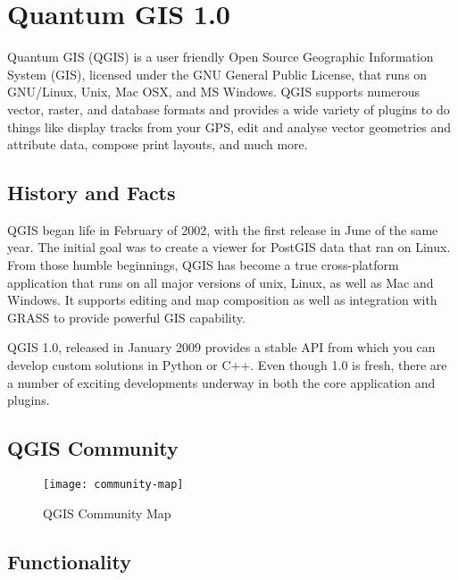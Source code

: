 \section{Quantum GIS 1.0}
\setcounter{page}{1}

Quantum GIS (QGIS) is a user friendly Open Source Geographic Information
System (GIS), licensed under the GNU General Public License, that runs on
GNU/Linux, Unix, Mac OSX, and MS Windows. QGIS supports numerous vector, 
raster, and database formats and provides a wide variety of plugins to do 
things like display tracks from your GPS, edit and analyse vector geometries 
and attribute data, compose print layouts, and much more.

\subsection{History and Facts}

QGIS began life in February of 2002, with the first release in June of the
same year. The initial goal was to create a viewer for PostGIS data that ran
on Linux. From those humble beginnings, QGIS has become a true cross-platform
application that runs on all major versions of unix, Linux, as well as Mac
and Windows. It supports editing and map composition as well as integration
with GRASS to provide powerful GIS capability. 

QGIS 1.0, released in January 2009 provides a stable API from which you can
develop custom solutions in Python or C++. Even though 1.0 is fresh, there
are a number of exciting developments underway in both the core application
and plugins.

\subsection{QGIS Community}

\begin{figure}[h]
   \begin{center}
   \caption{QGIS Community Map}\label{fig:community-map}\smallskip
   \texttt{[image: community-map]}
\end{center}
\end{figure}

\subsection{Functionality}



